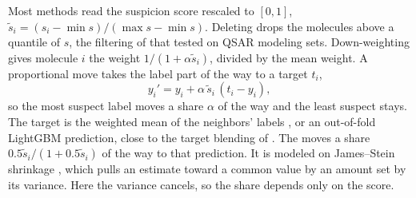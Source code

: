 Most methods read the suspicion score rescaled to $[0, 1]$, $\tilde s_i = (s_i - \min s)/(\max s - \min s)$. Deleting drops the molecules above a quantile of $s$, the filtering of \citet{Brodley1999} that \citet{Zhao2017} tested on QSAR modeling sets. Down-weighting gives molecule $i$ the weight $1/(1 + \alpha\tilde s_i)$, divided by the mean weight. A proportional move takes the label part of the way to a target $t_i$,
\begin{equation}
y_i' = y_i + \alpha\,\tilde s_i\,(t_i - y_i),
\label{eq:noise:move}
\end{equation}
so the most suspect label moves a share $\alpha$ of the way and the least suspect stays. The target is the weighted mean of the neighbors' labels \citep{nadaraya1964estimating, watson1964smooth}, or an out-of-fold LightGBM prediction, close to the target blending of \citet{reed2014training}. The  moves a share $0.5\tilde s_i/(1 + 0.5\tilde s_i)$ of the way to that prediction. It is modeled on James--Stein shrinkage \citep{james1961estimation}, which pulls an estimate toward a common value by an amount set by its variance. Here the variance cancels, so the share depends only on the score.

